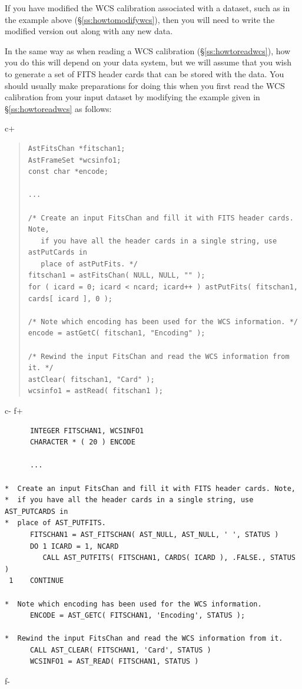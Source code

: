 \documentclass[twoside,11pt]{article}
\newcommand{\secref}[1]{\S\ref{#1}}
\newcommand{\secref}[1]{\ref{#1}}
\begin{document}
If you have modified the WCS calibration associated with a dataset,
such as in the example above (\secref{ss:howtomodifywcs}), then you
will need to write the modified version out along with any new data.

In the same way as when reading a WCS calibration
(\secref{ss:howtoreadwcs}), how you do this will depend on your data
system, but we will assume that you wish to generate a set of FITS
header cards that can be stored with the data. You should usually make
preparations for doing this when you first read the WCS calibration
from your input dataset by modifying the example given in
\secref{ss:howtoreadwcs} as follows:

c+
\begin{quote}
\small
\begin{verbatim}
AstFitsChan *fitschan1;
AstFrameSet *wcsinfo1;
const char *encode;

...

/* Create an input FitsChan and fill it with FITS header cards. Note,
   if you have all the header cards in a single string, use astPutCards in
   place of astPutFits. */
fitschan1 = astFitsChan( NULL, NULL, "" );
for ( icard = 0; icard < ncard; icard++ ) astPutFits( fitschan1, cards[ icard ], 0 );

/* Note which encoding has been used for the WCS information. */
encode = astGetC( fitschan1, "Encoding" );

/* Rewind the input FitsChan and read the WCS information from it. */
astClear( fitschan1, "Card" );
wcsinfo1 = astRead( fitschan1 );
\end{verbatim}
\normalsize
\end{quote}
c-
f+
\small
\begin{verbatim}
      INTEGER FITSCHAN1, WCSINFO1
      CHARACTER * ( 20 ) ENCODE

      ...

*  Create an input FitsChan and fill it with FITS header cards. Note,
*  if you have all the header cards in a single string, use AST_PUTCARDS in
*  place of AST_PUTFITS.
      FITSCHAN1 = AST_FITSCHAN( AST_NULL, AST_NULL, ' ', STATUS )
      DO 1 ICARD = 1, NCARD
         CALL AST_PUTFITS( FITSCHAN1, CARDS( ICARD ), .FALSE., STATUS )
 1    CONTINUE

*  Note which encoding has been used for the WCS information.
      ENCODE = AST_GETC( FITSCHAN1, 'Encoding', STATUS );

*  Rewind the input FitsChan and read the WCS information from it.
      CALL AST_CLEAR( FITSCHAN1, 'Card', STATUS )
      WCSINFO1 = AST_READ( FITSCHAN1, STATUS )
\end{verbatim}
\normalsize
f-
\end{document}
